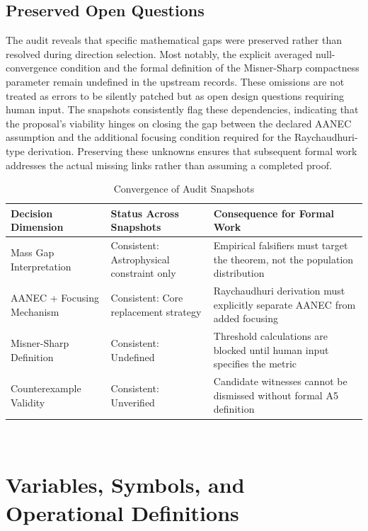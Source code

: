 \documentclass[conference]{IEEEtran}
\begin{document}
\subsection{Preserved Open Questions}
The audit reveals that specific mathematical gaps were preserved rather than resolved during direction selection. Most notably, the explicit averaged null-convergence condition and the formal definition of the Misner-Sharp compactness parameter remain undefined in the upstream records. These omissions are not treated as errors to be silently patched but as open design questions requiring human input. The snapshots consistently flag these dependencies, indicating that the proposal’s viability hinges on closing the gap between the declared AANEC assumption and the additional focusing condition required for the Raychaudhuri-type derivation. Preserving these unknowns ensures that subsequent formal work addresses the actual missing links rather than assuming a completed proof.

\begin{table}[htbp]
\centering
\footnotesize
\setlength{\tabcolsep}{3pt}
\renewcommand{\arraystretch}{1.12}
\caption{Convergence of Audit Snapshots}
\label{tab:appendix-idea-evolution-checkpoint-convergence-table}
\begin{tabular}{|p{}|p{}|p{}|}
\hline
Decision Dimension & Status Across Snapshots & Consequence for Formal Work \\\hline
Mass Gap Interpretation & Consistent: Astrophysical constraint only & Empirical falsifiers must target the theorem, not the population distribution \\\hline
AANEC + Focusing Mechanism & Consistent: Core replacement strategy & Raychaudhuri derivation must explicitly separate AANEC from added focusing \\\hline
Misner-Sharp Definition & Consistent: Undefined & Threshold calculations are blocked until human input specifies the metric \\\hline
Counterexample Validity & Consistent: Unverified & Candidate witnesses cannot be dismissed without formal A5 definition \\\hline
\end{tabular}
\end{table}~\cite{cite_0ed84243cf171bc4}

\section{Variables, Symbols, and Operational Definitions}
\end{document}
